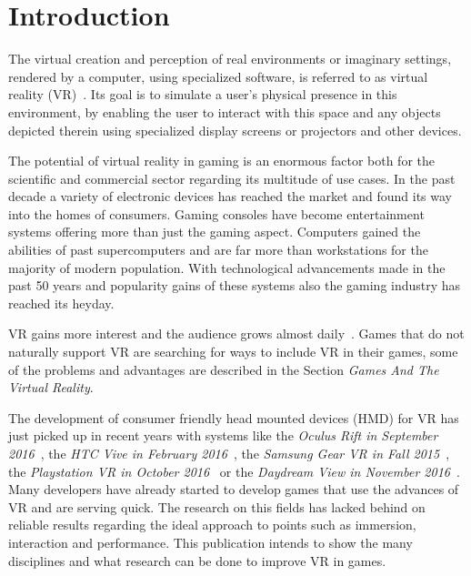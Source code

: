 \section{Introduction}

The virtual creation and perception of real environments or imaginary settings, rendered by a computer, using specialized software, is referred to as virtual reality (VR)~\cite{online:def:vr}. Its goal is to simulate a user's physical presence in this environment, by enabling the user to interact with this space and any objects depicted therein using specialized display screens or projectors and other devices.

The potential of virtual reality in gaming is an enormous factor both for the scientific and commercial sector regarding its multitude of use cases. \newline
In the past decade a variety of electronic devices has reached the market and found its way into the homes of consumers. Gaming consoles have become entertainment systems offering more than just the gaming aspect. Computers gained the abilities of past supercomputers and are far more than workstations for the majority of modern population. With technological advancements made in the past 50 years and popularity gains of these systems also the gaming industry has reached its heyday. 

VR
gains more interest and the audience grows almost daily~\cite{online:gamerStats}. Games that do not naturally support VR are searching for ways to include VR in their games, some of the problems and advantages are described in the Section \textit{Games And The Virtual Reality}.


The development of consumer friendly head mounted devices (HMD) for VR has just picked up in recent years with systems like the \textit{Oculus Rift in September 2016}~\cite{online:releaseOculus}, the \textit{HTC Vive in February 2016}~\cite{online:releaseVive}, the \textit{Samsung Gear VR in Fall 2015}~\cite{online:releaseGearVR}, the \textit{Playstation VR in October 2016}~\cite{online:releasePSVR} or the \textit{Daydream View in November 2016}~\cite{online:releaseGearVR}. \newline
Many developers have already started to develop games that use the advances of VR and are serving quick. The research on this fields has lacked behind on reliable results regarding the ideal approach to points such as immersion, interaction and performance. This publication intends to show the many disciplines and what research can be done to improve VR in games.

